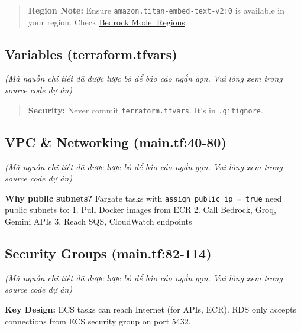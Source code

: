 \begin{Shaded}
\begin{Highlighting}[]
\NormalTok{\}}
\end{Highlighting}
\end{Shaded}

\begin{quote}
\textbf{Region Note:} Ensure \texttt{amazon.titan-embed-text-v2:0} is
available in your region. Check
\href{https://docs.aws.amazon.com/bedrock/latest/userguide/models-regions.html}{Bedrock
Model Regions}.
\end{quote}

\hypertarget{variables-terraform.tfvars}{%
\subsection{Variables
(terraform.tfvars)}}

\emph{(Mã nguồn chi tiết đã được lược bỏ để báo cáo ngắn gọn. Vui lòng
xem trong source code dự án)}

\begin{quote}
\textbf{Security:} Never commit \texttt{terraform.tfvars}. It's in
\texttt{.gitignore}.
\end{quote}

\hypertarget{vpc-networking-main.tf40-80}{%
\subsection{VPC \& Networking
(main.tf:40-80)}}

\emph{(Mã nguồn chi tiết đã được lược bỏ để báo cáo ngắn gọn. Vui lòng
xem trong source code dự án)}

\textbf{Why public subnets?} Fargate tasks with
\texttt{assign\_public\_ip\ =\ true} need public subnets to: 1. Pull
Docker images from ECR 2. Call Bedrock, Groq, Gemini APIs 3. Reach SQS,
CloudWatch endpoints

\hypertarget{security-groups-main.tf82-114}{%
\subsection{Security Groups
(main.tf:82-114)}}

\emph{(Mã nguồn chi tiết đã được lược bỏ để báo cáo ngắn gọn. Vui lòng
xem trong source code dự án)}

\textbf{Key Design:} ECS tasks can reach Internet (for APIs, ECR). RDS
only accepts connections from ECS security group on port 5432.

